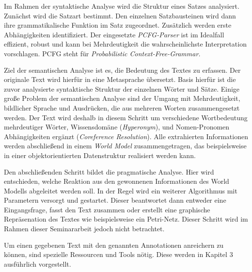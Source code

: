 Im Rahmen der syntaktische Analyse wird die Struktur eines Satzes analysiert. Zunächst wird die Satzart bestimmt. Den einzelnen Satzbausteinen wird dann ihre grammatikalische Funktion im Satz zugeordnet. Zusätzlich werden erste Ab\-häng\-ig\-keit\-en identifiziert. Der eingesetzte \textit{PCFG-Parser} ist im Idealfall effizient, robust und kann bei Mehrdeutigkeit die wahrscheinlichste Interpretation vorschlagen. PCFG steht für \textit{Probabilistic Context-Free-Grammar.}\par
Ziel der semantischen Analyse ist es, die Bedeutung des Textes zu erfassen. Der originale Text wird hierfür in eine Metasprache übersetzt. Basis hierfür ist die zuvor analysierte syntaktische Struktur der einzelnen Wörter und Sätze. Einige große Problem der semantischen Analyse sind der Umgang mit Mehrdeutigkeit, bildlicher Sprache und Ausdrücken, die aus mehreren Worten zusammengesetzt werden. Der Text wird deshalb in diesem Schritt um verschiedene Wortbedeutung mehrdeutiger Wörter, Wissensdomäne (\textit{Hyperonym}), und Nomen-Pronomen Abhängigkeiten ergänzt (\textit{Coreference Resolution}). Alle extrahierten Informationen werden abschließend in einem \textit{World Model} zusammengetragen, das beispielsweise in einer objektorientierten Datenstruktur realisiert werden kann.\par
Den abschließenden Schritt bildet die pragmatische Analyse. Hier wird entschieden, welche Reaktion aus den gewonnenen Informationen des World Modells abgeleitet werden soll. In der Regel wird ein weiterer Algorithmus mit Parametern versorgt und gestartet. Dieser beantwortet dann entweder eine Eingangsfrage, fasst den Text zusammen oder erstellt eine graphische Repräsenation des Textes wie beispielsweise ein Petri-Netz. Dieser Schritt wird im Rahmen dieser Seminararbeit jedoch nicht betrachtet.

Um einen gegebenen Text mit den genannten Annotationen anreichern zu können, sind spezielle Ressourcen und Tools nötig. Diese werden in Kapitel 3 ausführlich vorgestellt.






